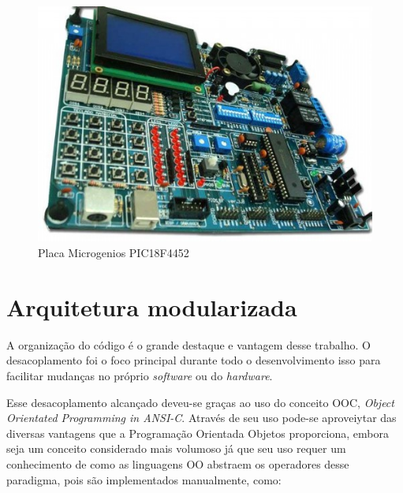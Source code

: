  \newpage
 
 \begin{figure}[htp]
 	\centering
 	\includegraphics[scale=1]{images/pic_microgenio.png}
 	\caption{Placa Microgenios PIC18F4452}	
 	\label{fig:microgenios}
 \end{figure}

\section{Arquitetura modularizada}

A organização do código é o grande destaque e vantagem desse trabalho. O desacoplamento foi o foco principal durante todo o desenvolvimento isso para facilitar mudanças no próprio \emph{software} ou do \emph{hardware}.

Esse desacoplamento alcançado deveu-se graças ao uso do conceito OOC, \emph{Object Orientated Programming in ANSI-C}. Através de seu uso pode-se aproveiytar das diversas vantagens que a Programação Orientada Objetos proporciona, embora seja um conceito considerado mais volumoso já que seu uso requer um conhecimento de como as linguagens OO abstraem os operadores desse paradigma, pois são implementados manualmente, como:

